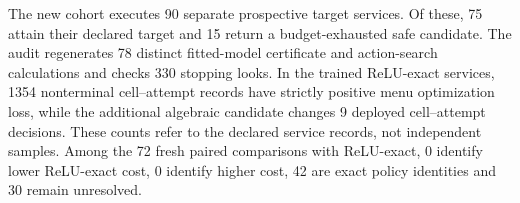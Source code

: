 The new cohort executes 90 separate prospective target services. Of these, 75 attain their declared target and 15 return a budget-exhausted safe candidate. The audit regenerates 78 distinct fitted-model certificate and action-search calculations and checks 330 stopping looks. In the trained ReLU-exact services, 1354 nonterminal cell--attempt records have strictly positive menu optimization loss, while the additional algebraic candidate changes 9 deployed cell--attempt decisions. These counts refer to the declared service records, not independent samples. Among the 72 fresh paired comparisons with ReLU-exact, 0 identify lower ReLU-exact cost, 0 identify higher cost, 42 are exact policy identities and 30 remain unresolved.
